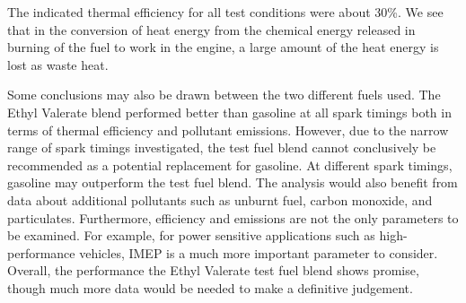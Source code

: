 The indicated thermal efficiency for all test conditions were about 30\%. We see that in the conversion of heat energy from the chemical energy released in burning of the fuel to work in the engine, a large amount of the heat energy is lost as waste heat.

Some conclusions may also be drawn between the two different fuels used. The Ethyl Valerate blend performed better than gasoline at all spark timings both in terms of thermal efficiency and pollutant emissions. However, due to the narrow range of spark timings investigated, the test fuel blend cannot conclusively be recommended as a potential replacement for gasoline. At different spark timings, gasoline may outperform the test fuel blend. The analysis would also benefit from data about additional pollutants such as unburnt fuel, carbon monoxide, and particulates. Furthermore, efficiency and emissions are not the only parameters to be examined. For example, for power sensitive applications such as high-performance vehicles, IMEP is a much more important parameter to consider. Overall, the performance the Ethyl Valerate test fuel blend shows promise, though much more data would be needed to make a definitive judgement.
